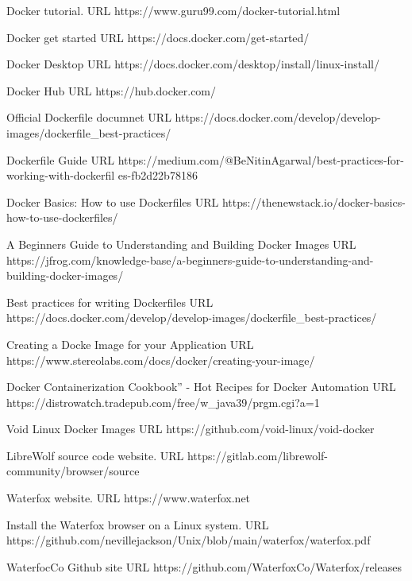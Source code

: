 \documentclass{article}  %
\begin{document}
\begin{thebibliography}{99}

Docker tutorial.
URL https://www.guru99.com/docker-tutorial.html

Docker get started
URL https://docs.docker.com/get-started/

Docker Desktop
URL https://docs.docker.com/desktop/install/linux-install/

Docker Hub
URL https://hub.docker.com/

Official Dockerfile documnet
URL https://docs.docker.com/develop/develop-images/dockerfile\_best-practices/


Dockerfile Guide
URL https://medium.com/@BeNitinAgarwal/best-practices-for-working-with-dockerfil
es-fb2d22b78186

Docker Basics: How to use Dockerfiles
URL https://thenewstack.io/docker-basics-how-to-use-dockerfiles/

A Beginners Guide to Understanding and Building Docker Images
URL https://jfrog.com/knowledge-base/a-beginners-guide-to-understanding-and-building-docker-images/

Best practices for writing Dockerfiles
URL https://docs.docker.com/develop/develop-images/dockerfile\_best-practices/


Creating a Docke Image for your Application
URL https://www.stereolabs.com/docs/docker/creating-your-image/

Docker Containerization Cookbook” - Hot Recipes for Docker Automation
URL https://distrowatch.tradepub.com/free/w\_java39/prgm.cgi?a=1

Void Linux Docker Images
URL https://github.com/void-linux/void-docker


LibreWolf source code website.
URL https://gitlab.com/librewolf-community/browser/source


Waterfox website. URL https://www.waterfox.net

Install the Waterfox browser on a Linux system. URL https://github.com/nevillejackson/Unix/blob/main/waterfox/waterfox.pdf

WaterfocCo Github site URL https://github.com/WaterfoxCo/Waterfox/releases

\end{thebibliography}
\end{document}
